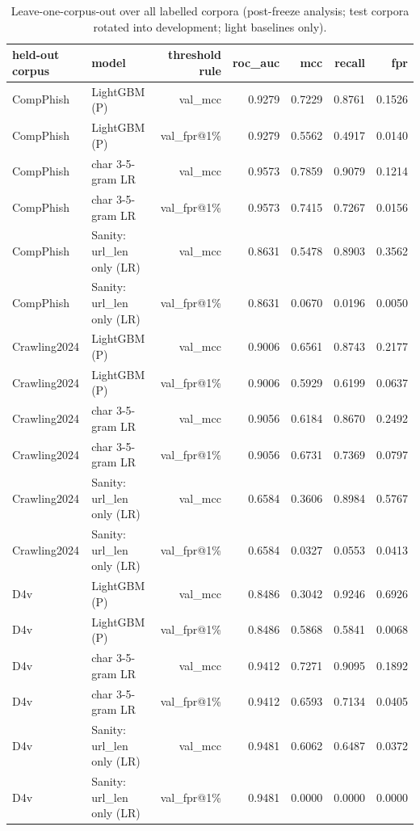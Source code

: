 \begin{table}[t]
\centering
\scriptsize
\caption{Leave-one-corpus-out over all labelled corpora (post-freeze analysis; test corpora rotated into development; light baselines only).}
\label{tab:rev_R13_loco_all_labelled_corpora}
\begin{tabular}{llrrrrr}
\toprule
held-out corpus & model & threshold rule & roc\_auc & mcc & recall & fpr \\
\midrule
CompPhish & LightGBM (P) & val\_mcc & 0.9279 & 0.7229 & 0.8761 & 0.1526 \\
CompPhish & LightGBM (P) & val\_fpr@1\% & 0.9279 & 0.5562 & 0.4917 & 0.0140 \\
CompPhish & char 3-5-gram LR & val\_mcc & 0.9573 & 0.7859 & 0.9079 & 0.1214 \\
CompPhish & char 3-5-gram LR & val\_fpr@1\% & 0.9573 & 0.7415 & 0.7267 & 0.0156 \\
CompPhish & Sanity: url\_len only (LR) & val\_mcc & 0.8631 & 0.5478 & 0.8903 & 0.3562 \\
CompPhish & Sanity: url\_len only (LR) & val\_fpr@1\% & 0.8631 & 0.0670 & 0.0196 & 0.0050 \\
Crawling2024 & LightGBM (P) & val\_mcc & 0.9006 & 0.6561 & 0.8743 & 0.2177 \\
Crawling2024 & LightGBM (P) & val\_fpr@1\% & 0.9006 & 0.5929 & 0.6199 & 0.0637 \\
Crawling2024 & char 3-5-gram LR & val\_mcc & 0.9056 & 0.6184 & 0.8670 & 0.2492 \\
Crawling2024 & char 3-5-gram LR & val\_fpr@1\% & 0.9056 & 0.6731 & 0.7369 & 0.0797 \\
Crawling2024 & Sanity: url\_len only (LR) & val\_mcc & 0.6584 & 0.3606 & 0.8984 & 0.5767 \\
Crawling2024 & Sanity: url\_len only (LR) & val\_fpr@1\% & 0.6584 & 0.0327 & 0.0553 & 0.0413 \\
D4v & LightGBM (P) & val\_mcc & 0.8486 & 0.3042 & 0.9246 & 0.6926 \\
D4v & LightGBM (P) & val\_fpr@1\% & 0.8486 & 0.5868 & 0.5841 & 0.0068 \\
D4v & char 3-5-gram LR & val\_mcc & 0.9412 & 0.7271 & 0.9095 & 0.1892 \\
D4v & char 3-5-gram LR & val\_fpr@1\% & 0.9412 & 0.6593 & 0.7134 & 0.0405 \\
D4v & Sanity: url\_len only (LR) & val\_mcc & 0.9481 & 0.6062 & 0.6487 & 0.0372 \\
D4v & Sanity: url\_len only (LR) & val\_fpr@1\% & 0.9481 & 0.0000 & 0.0000 & 0.0000 \\

\end{tabular}
\end{table}
